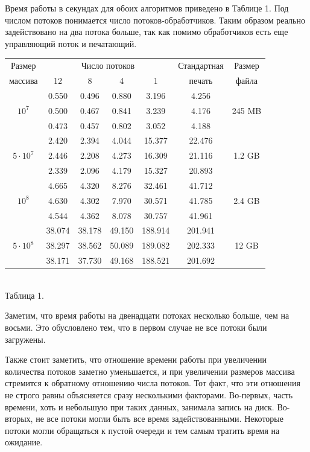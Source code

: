 Время работы в секундах для обоих алгоритмов приведено в Таблице 1.
Под числом потоков понимается число потоков-обработчиков. 
Таким образом реально задействовано на два потока больше, так как помимо обработчиков есть еще управляющий поток и печатающий.
\begin{center}
\begin{tabular}{||c|c|c|c|c|c|c||}
\hline
\hline
Размер & \multicolumn{4}{c|}{Число потоков} & Стандартная & Размер\\
\hhline{~|-|-|-|-|~|~|}
массива & 12 & 8 & 4 & 1 & печать &файла\\
\hline
\hline
& 0.550 & 0.496 & 0.880 & 3.196 & 4.256 & \\
\hhline{~|-|-|-|-|-|~|}
$10^7$  & 0.500 & 0.467 & 0.841 & 3.239 & 4.176 & 245 MB \\
\hhline{~|-|-|-|-|-|~|}
& 0.473 & 0.457 & 0.802 & 3.052 & 4.188 &\\
\hline
& 2.420 &2.394& 4.044 & 15.377 & 22.476 & \\
\hhline{~|-|-|-|-|-|~|}
$5 \cdot 10^7$  & 2.446 & 2.208& 4.273 & 16.309 & 21.116 &  1.2 GB\\
\hhline{~|-|-|-|-|-|~|}
& 2.339 & 2.096 & 4.179 & 15.327 & 20.893 & \\
\hline
& 4.665 & 4.320 & 8.276 & 32.461 & 41.712 & \\
\hhline{~|-|-|-|-|-|~|}
$10^8$  & 4.630 & 4.302 & 7.970 & 30.571 & 41.785 & 2.4 GB\\
\hhline{~|-|-|-|-|-|~|}
& 4.544 & 4.362& 8.078 & 30.757 & 41.961 & \\
\hline
 & 38.074 & 38.178 & 49.150 & 188.914 & 201.941 & \\
\hhline{~|-|-|-|-|-|~|}
$5 \cdot 10^8$ & 38.297 & 38.562 & 50.089 & 189.082 & 202.333 & 12 GB\\
\hhline{~|-|-|-|-|-|~|}
 & 38.171 & 37.730 & 49.168 & 188.521 & 201.692 & \\
\hline
\hline
\end{tabular}\\ \vspace{10pt}
\small{Таблица 1.}
\end{center}
Заметим, что время работы на двенадцати потоках несколько больше, чем на восьми. 
Это обусловлено тем, что в первом случае не все потоки были загружены.

Также стоит заметить, что отношение времени работы при увеличении количества потоков заметно уменьшается, и при увеличении размеров массива стремится к обратному отношению числа потоков.
Тот факт, что эти отношения не строго равны объясняется сразу несколькими факторами.
Во-первых, часть времени, хоть и небольшую при таких данных, занимала запись на диск.
Во-вторых, не все потоки могли быть все время задействованными.
Некоторые потоки могли обращаться к пустой очереди и тем самым тратить время на ожидание.

